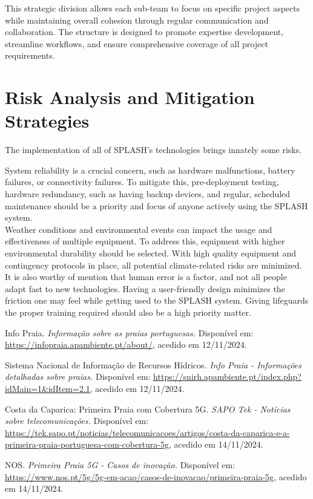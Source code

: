 This strategic division allows each sub-team to focus on specific project aspects while maintaining overall cohesion through regular communication and collaboration. The structure is designed to promote expertise development, streamline workflows, and ensure comprehensive coverage of all project requirements.


\section{Risk Analysis and Mitigation Strategies}
\label{section:risk_analisys_mitigation_strategies}

The implementation of all of SPLASH's technologies brings innately some risks.

System reliability is a crucial concern, such as hardware malfunctions, battery failures, or connectivity failures. To mitigate this, pre-deployment testing, hardware redundancy, such as having backup devices, and regular, scheduled maintenance should be a priority and focus of anyone actively using the SPLASH system.\\

Weather conditions and environmental events can impact the usage and effectiveness of multiple equipment. To address this, equipment with higher environmental durability should be selected. With high quality equipment and contingency protocols in place, all potential climate-related risks are minimized.\\

It is also worthy of mention that human error is a factor, and not all people adapt fast to new technologies. Having a user-friendly design minimizes the friction one may feel while getting used to the SPLASH system. Giving lifeguards the proper training required should also be a high priority matter.\\




\begin{thebibliography}{9}

Info Praia.
\textit{Informação sobre as praias portuguesas.}
Disponível em: \url{https://infopraia.apambiente.pt/about/}, acedido em 12/11/2024.

Sistema Nacional de Informação de Recursos Hídricos.
\textit{Info Praia - Informações detalhadas sobre praias.}
Disponível em: \url{https://snirh.apambiente.pt/index.php?idMain=1&idItem=2.1}, acedido em 12/11/2024.

Costa da Caparica: Primeira Praia com Cobertura 5G.
\textit{SAPO Tek - Notícias sobre telecomunicações.}
Disponível em: \url{https://tek.sapo.pt/noticias/telecomunicacoes/artigos/costa-da-caparica-e-a-primeira-praia-portuguesa-com-cobertura-5g}, acedido em 14/11/2024.

NOS.
\textit{Primeira Praia 5G - Casos de inovação.}
Disponível em: \url{https://www.nos.pt/5g/5g-em-acao/casos-de-inovacao/primeira-praia-5g}, acedido em 14/11/2024.

\end{thebibliography}
